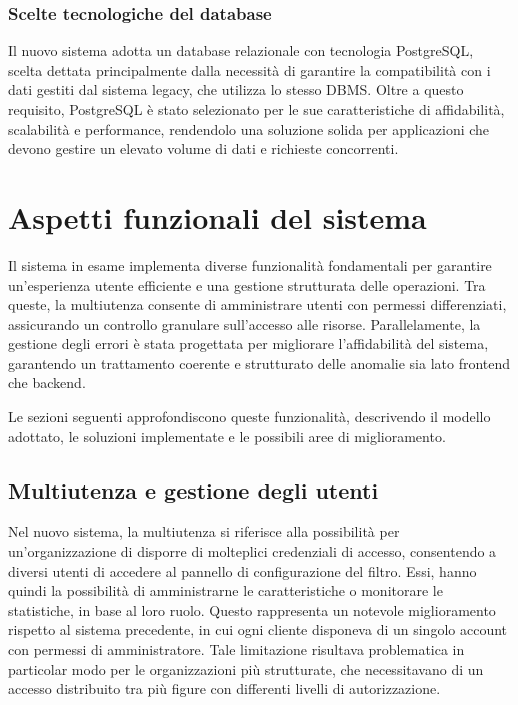 \subsubsection{Scelte tecnologiche del database}
Il nuovo sistema adotta un database relazionale con tecnologia PostgreSQL, scelta dettata principalmente dalla necessità di garantire la compatibilità con i dati gestiti dal sistema legacy, che utilizza lo stesso DBMS. Oltre a questo requisito, PostgreSQL è stato selezionato per le sue caratteristiche di affidabilità, scalabilità e performance, rendendolo una soluzione solida per applicazioni che devono gestire un elevato volume di dati e richieste concorrenti.

\section{Aspetti funzionali del sistema}
Il sistema in esame implementa diverse funzionalità fondamentali per garantire un'esperienza utente efficiente e una gestione strutturata delle operazioni. Tra queste, la multiutenza consente di amministrare utenti con permessi differenziati, assicurando un controllo granulare sull’accesso alle risorse. Parallelamente, la gestione degli errori è stata progettata per migliorare l'affidabilità del sistema, garantendo un trattamento coerente e strutturato delle anomalie sia lato frontend che backend.

Le sezioni seguenti approfondiscono queste funzionalità, descrivendo il modello adottato, le soluzioni implementate e le possibili aree di miglioramento.

\subsection{Multiutenza e gestione degli utenti}
Nel nuovo sistema, la multiutenza si riferisce alla possibilità per un'organizzazione di disporre di molteplici credenziali di accesso, consentendo a diversi utenti di accedere al pannello di configurazione del filtro. Essi, hanno quindi la possibilità di amministrarne le caratteristiche o monitorare le statistiche, in base al loro ruolo. Questo rappresenta un notevole miglioramento rispetto al sistema precedente, in cui ogni cliente disponeva di un singolo account con permessi di amministratore. Tale limitazione risultava problematica in particolar modo per le organizzazioni più strutturate, che necessitavano di un accesso distribuito tra più figure con differenti livelli di autorizzazione.


